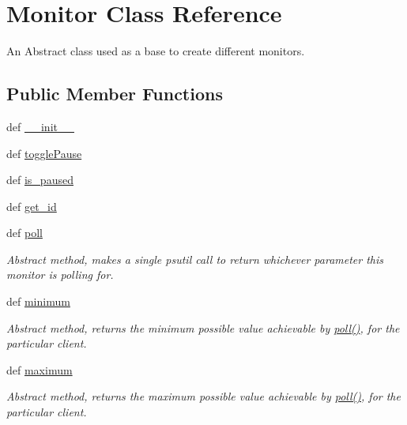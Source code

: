 \hypertarget{classsrc_1_1client_1_1_monitor_1_1_monitor}{\section{Monitor Class Reference}
\label{classsrc_1_1client_1_1_monitor_1_1_monitor}
}


An Abstract class used as a base to create different monitors.  


\subsection*{Public Member Functions}
\begin{DoxyCompactItemize}
\item 
def \hyperlink{classsrc_1_1client_1_1_monitor_1_1_monitor_ac775ee34451fdfa742b318538164070e}{\-\_\-\-\_\-init\-\_\-\-\_\-}
\item 
def \hyperlink{classsrc_1_1client_1_1_monitor_1_1_monitor_a0e0ee93ca3f230923c58fe95eb5d5126}{toggle\-Pause}
\item 
def \hyperlink{classsrc_1_1client_1_1_monitor_1_1_monitor_ab32012b1ca0c5f814dd17a92b48c08fe}{is\-\_\-paused}
\item 
def \hyperlink{classsrc_1_1client_1_1_monitor_1_1_monitor_a02ebbca65067fb1a2947d36460ca6f50}{get\-\_\-id}
\item 
def \hyperlink{classsrc_1_1client_1_1_monitor_1_1_monitor_a87cd0076a6d482a01482f25a64cf2fb4}{poll}
\begin{DoxyCompactList}\small\item\em Abstract method, makes a single psutil call to return whichever parameter this monitor is polling for. \end{DoxyCompactList}\item 
def \hyperlink{classsrc_1_1client_1_1_monitor_1_1_monitor_a4515aa6e0be4391413959391fef1109f}{minimum}
\begin{DoxyCompactList}\small\item\em Abstract method, returns the minimum possible value achievable by \hyperlink{classsrc_1_1client_1_1_monitor_1_1_monitor_a87cd0076a6d482a01482f25a64cf2fb4}{poll()}, for the particular client. \end{DoxyCompactList}\item 
def \hyperlink{classsrc_1_1client_1_1_monitor_1_1_monitor_a8f6589fdc9d322ec8e0dc2c7ede55ce9}{maximum}
\begin{DoxyCompactList}\small\item\em Abstract method, returns the maximum possible value achievable by \hyperlink{classsrc_1_1client_1_1_monitor_1_1_monitor_a87cd0076a6d482a01482f25a64cf2fb4}{poll()}, for the particular client. \end{DoxyCompactList}\end{DoxyCompactItemize}
